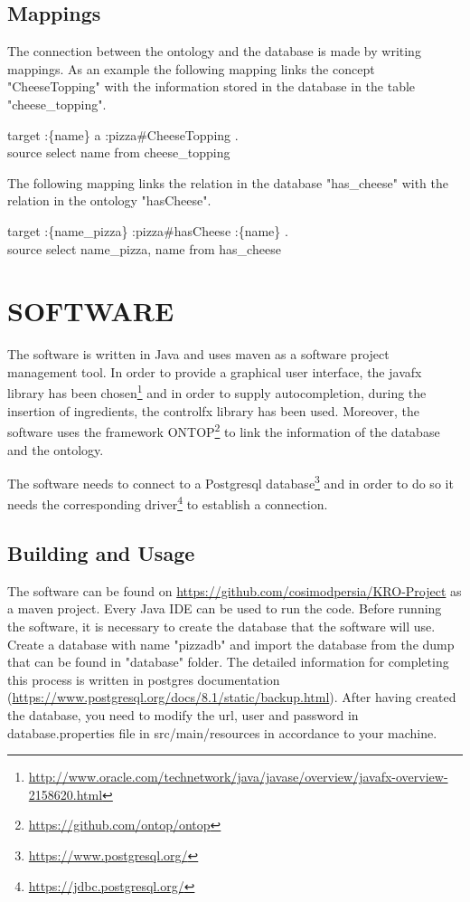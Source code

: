 \documentclass[10pt,a4paper]{article}
\begin{document}
\subsection*{Mappings}

The connection between the ontology and the database is made by writing mappings. As an example the following mapping links the concept "CheeseTopping" with the information stored in the database in the table "cheese\_topping".
\begin{center}
target		:\{name\} a :pizza\#{CheeseTopping} .  \\
source		select name from cheese\_topping
\end{center}

The following mapping links the relation in the database "has\_cheese" with the relation in the ontology "hasCheese".
\begin{center}
target		:\{name\_pizza\} :pizza\#{hasCheese} :\{name\} .  \\
source		select name\_pizza, name from has\_cheese
\end{center}


\section*{SOFTWARE}
The software is written in Java and uses maven as a software project management tool. In order to provide a graphical user interface, the javafx library has been chosen\footnote{\url{http://www.oracle.com/technetwork/java/javase/overview/javafx-overview-2158620.html}} and in order to supply autocompletion, during the insertion of ingredients, the controlfx library has been used.
Moreover, the software uses the framework ONTOP\footnote{\url{https://github.com/ontop/ontop}} to link the information of the database and the ontology. 

The software needs to connect to a Postgresql database\footnote{\url{https://www.postgresql.org/}} and in order to do so it needs the corresponding driver\footnote{\url{https://jdbc.postgresql.org/}} to establish a connection. 

\subsection*{Building and Usage}
The software can be found on \url{https://github.com/cosimodpersia/KRO-Project} as a maven project. Every Java IDE can be used to run the code.
Before running the software, it is necessary to create the database that the software will use. 
Create a database with name "pizzadb" and import the database from the dump that can be found in "database" folder. The detailed information for completing this process is written in postgres documentation (\url{https://www.postgresql.org/docs/8.1/static/backup.html}).
After having created the database, you need to modify the url, user and password in database.properties file in src/main/resources in accordance to your machine.
\end{document}
